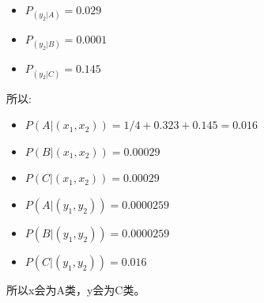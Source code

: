 \documentclass[answers]{exam}  %
\begin{document}
\begin{enumerate}[label=\alph*.]
\begin{itemize}
        \item $P_{(y_2|A)} = 0.029$
        \item $P_{(y_2|B)} = 0.0001$
        \item $P_{(y_2|C)} = 0.145$
    \end{itemize}
    所以:
    \begin{itemize}
        \item $P(A|(x_1,x_2)) = 1/4 + 0.323 + 0.145 = 0.016$
        \item $P(B|(x_1,x_2)) = 0.00029$
        \item $P(C|(x_1,x_2)) = 0.00029$
        \item $P(A|(y_1,y_2)) = 0.0000259$
        \item $P(B|(y_1,y_2)) = 0.0000259$
        \item $P(C|(y_1,y_2)) = 0.016$
    \end{itemize}
    所以x会为A类，y会为C类。
\end{enumerate}
\end{document}
